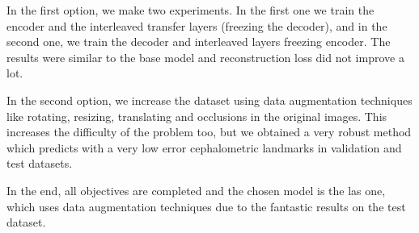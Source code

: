 \medskip

\noindent In the first option, we make two experiments. In the first one we train the encoder and the interleaved transfer layers (freezing the decoder), and in the second one, we train the decoder and interleaved layers freezing encoder. The results were similar to the base model and reconstruction loss did not improve a lot.

\medskip

\noindent In the second option, we increase the dataset using data augmentation techniques like rotating, resizing, translating and occlusions in the original images. This increases the difficulty of the problem too, but we obtained a very robust method which predicts with a very low error cephalometric landmarks in validation and test datasets.

\medskip

\noindent In the end, all objectives are completed and the chosen model is the las one, which uses data augmentation techniques due to the fantastic results on the test dataset.


\endinput

